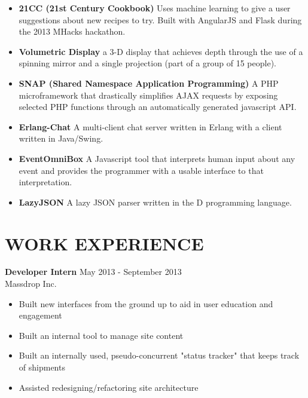 \documentclass[line,margin]{res}
\begin{document}
\begin{resume}
\begin{itemize}
\item {\bf 21CC (21st Century Cookbook)} Uses machine learning to give a user 
   suggestions about new recipes to try. Built with AngularJS and Flask during
   the 2013 MHacks hackathon.

\item {\bf Volumetric Display} a 3-D display that achieves depth through the 
   use of a spinning mirror and a single projection 
   (part of a group of 15 people).

\item {\bf SNAP (Shared Namespace Application Programming)} 
   A PHP microframework that drastically simplifies AJAX requests by 
   exposing selected PHP functions through an automatically generated
   javascript API.




\item {\bf Erlang-Chat}   A multi-client chat server written in Erlang with a 
   client written in Java/Swing.

\item {\bf EventOmniBox}  A Javascript tool that interprets human input about 
   any event and provides the programmer with a usable interface to that 
   interpretation.


\item {\bf LazyJSON}  A lazy JSON parser written in the D programming language.


\end{itemize}
 
\section{WORK EXPERIENCE} 
			   {\bf Developer Intern} \hfill May 2013 - September 2013\\
			   Massdrop Inc.
			   \begin{itemize} \itemsep -2pt
				  \item Built new interfaces from the ground up to aid in user education and engagement
				  \item Built an internal tool to manage site content
				  \item Built an internally used, pseudo-concurrent "status tracker" that keeps track
					 of shipments
				  \item Assisted redesigning/refactoring site architecture
			   \end{itemize}


\end{resume}
\end{document}
